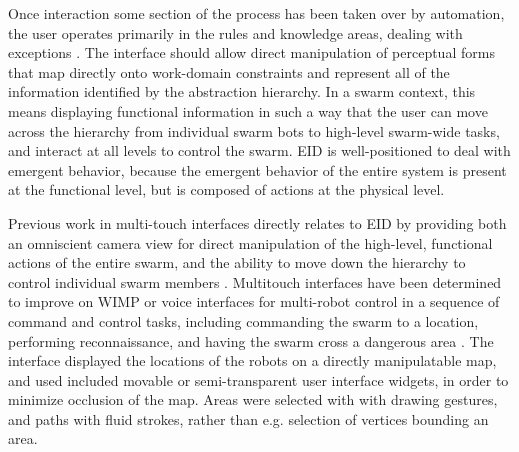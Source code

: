 \documentclass[]{article}
\begin{document}
Once interaction some section of the process has been taken over by automation, the user operates primarily in the rules and knowledge areas, dealing with exceptions \cite{vicente2002ecological}.
The interface should allow direct manipulation of perceptual forms that map directly onto work-domain constraints and represent all of the information identified by the abstraction hierarchy. 
In a swarm context, this means displaying functional information in such a way that the user can move across the hierarchy from individual swarm bots to high-level swarm-wide tasks, and interact at all levels to control the swarm. 
EID is well-positioned to deal with emergent behavior, because the emergent behavior of the entire system is present at the functional level, but is composed of actions at the physical level.  

Previous work in multi-touch interfaces directly relates to EID by providing both an omniscient camera view for direct manipulation of the high-level, functional actions of the entire swarm, and the ability to move down the hierarchy to control individual swarm members \cite{Micire:2009:ANG:1731903.1731912}.
Multitouch interfaces have been determined to improve on WIMP or voice interfaces for multi-robot control in a sequence of command and control tasks, including commanding the swarm to a location, performing reconnaissance, and having the swarm cross a dangerous area \cite{hayes2010multi}.
The interface displayed the locations of the robots on a directly manipulatable map, and used included movable or semi-transparent user interface widgets, in order to minimize occlusion of the map. 
Areas were selected with with drawing gestures, and paths with fluid strokes, rather than e.g. selection of vertices bounding an area.
\end{document}
